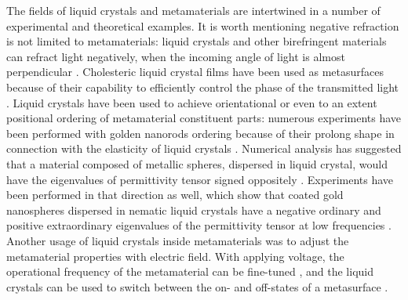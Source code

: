 \documentclass[a4paper,11pt]{article}
\begin{document}

The fields of liquid crystals and metamaterials are intertwined in a number of experimental and theoretical examples. 
It is worth mentioning negative refraction is not limited to metamaterials: liquid crystals and other birefringent materials can refract light negatively, when the incoming angle of light is almost perpendicular \cite{lavrentovich-2006-lc-neg}.
Cholesteric liquid crystal films have been used as metasurfaces because of their capability to efficiently control the phase of the transmitted light \cite{ozaki-2016-patterned-lc}.
Liquid crystals have been used to achieve orientational or even to an extent positional ordering of metamaterial constituent parts: numerous experiments have been performed with golden nanorods ordering because of their prolong shape in connection with the elasticity of liquid crystals \cite{lavrentovich-2008-gold-nanorods,smalyukh-2010-self-alignment,lavrentovich-2009-nanorods}. 
Numerical analysis has suggested that a material composed of metallic spheres, dispersed in liquid crystal, would have the eigenvalues of permittivity tensor signed oppositely \cite{xuan-2013-nanoparticle-lc,khoo-2014-nanoparticle-lc}. 
Experiments have been performed in that direction as well, which show that coated gold nanospheres dispersed in nematic liquid crystals have a negative ordinary and positive extraordinary eigenvalues of the permittivity tensor at low frequencies \cite{goodby-2011-lc-gold-mtm}. 
% 
% 
% 
Another usage of liquid crystals inside metamaterials was to adjust the metamaterial properties with electric field. 
With applying voltage, the operational frequency of the metamaterial can be fine-tuned \cite{zhang-2007-lc-mtm-tuning,shalaev-2007-tunable-lc}, and the liquid crystals can be used to switch between the on- and off-states of a metasurface \cite{buchnev-2015-lc-mtm-switch}. 
\end{document}
